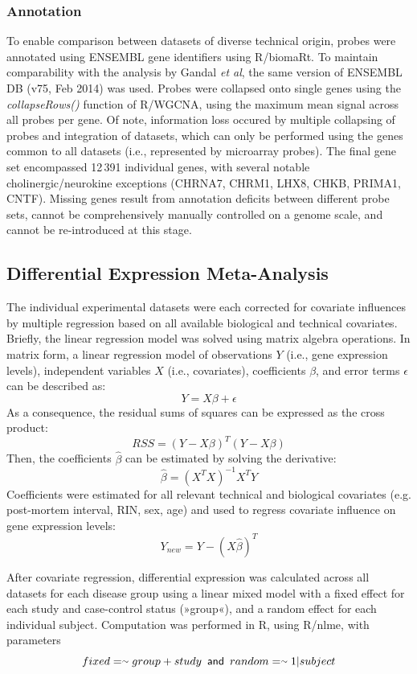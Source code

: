 \begin{method}
\subsubsection{Annotation}
To enable comparison between datasets of diverse technical origin, probes were annotated using ENSEMBL gene identifiers using R/biomaRt.\cite{Durinck2009} To maintain comparability with the analysis by Gandal \emph{et al},\cite{Gandal2018} the same version of ENSEMBL DB (v75, Feb 2014) was used. Probes were collapsed onto single genes using the \emph{collapseRows()} function of R/WGCNA,\cite{Langfelder2008} using the maximum mean signal across all probes per gene. Of note, information loss occured by multiple collapsing of probes and integration of datasets, which can only be performed using the genes common to all datasets (i.e., represented by microarray probes). The final gene set encompassed 12\,391 individual genes, with several notable cholinergic/neurokine exceptions (CHRNA7, CHRM1, LHX8, CHKB, PRIMA1, CNTF). Missing genes result from annotation deficits between different probe sets, cannot be comprehensively manually controlled on a genome scale, and cannot be re-introduced at this stage. 

\subsection{Differential Expression Meta-Analysis}
The individual experimental datasets were each corrected for covariate influences by multiple regression based on all available biological and technical covariates. Briefly, the linear regression model was solved using matrix algebra operations. In matrix form, a linear regression model of observations $Y$ (i.e., gene expression levels), independent variables $X$ (i.e., covariates), coefficients $\beta$, and error terms $\epsilon$ can be described as: $$Y = X\beta + \epsilon$$ As a consequence, the residual sums of squares can be expressed as the cross product: $$RSS = (Y - X\beta)^T(Y - X\beta)$$ Then, the coefficients $\hat{\beta}$ can be estimated by solving the derivative: $$\hat{\beta} = (X^TX)^{-1} X^TY$$ Coefficients were estimated for all relevant technical and biological covariates (e.g. post-mortem interval, RIN, sex, age) and used to regress covariate influence on gene expression levels: $$Y_{new} = Y - (X\hat{\beta})^T$$

After covariate regression, differential expression was calculated across all datasets for each disease group using a linear mixed model with a fixed effect for each study and case-control status (»group«), and a random effect for each individual subject. Computation was performed in R, using R/nlme,\cite{Pinheiro2019} with parameters $$fixed = \smallsim group + study\textrm{\sffamily\,\,\,and\,\,\,}random = \smallsim 1|subject$$


\end{method}
